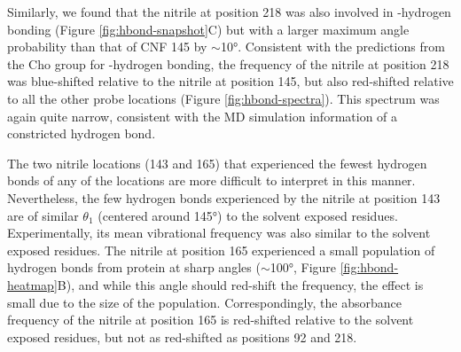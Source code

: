 Similarly, we found that the nitrile at position 218 was also involved in \textpi{}-hydrogen bonding (Figure \ref{fig:hbond-snapshot}C) but with a larger maximum angle probability than that of CNF 145 by $\sim$\ang{10}.
Consistent with the predictions from the Cho group for \textpi{}-hydrogen bonding, the frequency of the nitrile at position 218 was blue-shifted relative to the nitrile at position 145, but also red-shifted relative to all the other probe locations (Figure \ref{fig:hbond-spectra}).
This spectrum was again quite narrow, consistent with the MD simulation information of a constricted hydrogen bond. 

The two nitrile locations (143 and 165) that experienced the fewest hydrogen bonds of any of the locations are more difficult to interpret in this manner.
Nevertheless, the few hydrogen bonds experienced by the nitrile at position 143 are of similar $\theta_1$ (centered around \ang{145}) to the solvent exposed residues.
Experimentally, its mean vibrational frequency was also similar to the solvent exposed residues.
The nitrile at position 165 experienced a small population of hydrogen bonds from protein at sharp angles ($\sim$\ang{100}, Figure \ref{fig:hbond-heatmap}B), and while this angle should red-shift the frequency, the effect is small due to the size of the population.
Correspondingly, the absorbance frequency of the nitrile at position 165 is red-shifted relative to the solvent exposed residues, but not as red-shifted as positions 92 and 218. 


